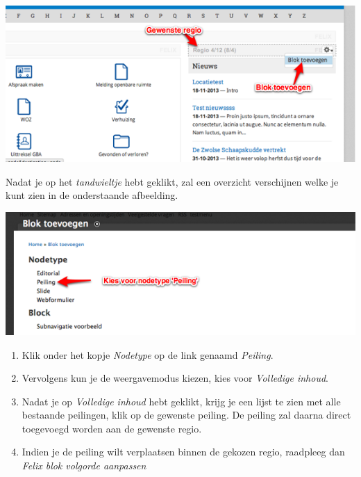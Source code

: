 \begin{center}
	\includegraphics[width=\textwidth]{img/peiling_2.png}
\end{center}

Nadat je op het \emph{tandwieltje} hebt geklikt, zal een overzicht verschijnen welke je kunt zien in de onderstaande afbeelding.

\begin{center}
	\includegraphics[width=\textwidth]{img/peiling_3.png}
\end{center}

\begin{enumerate}
\item Klik onder het kopje \emph{Nodetype} op de link genaamd \emph{Peiling}.
\item Vervolgens kun je de weergavemodus kiezen, kies voor \emph{Volledige inhoud}.
\item Nadat je op \emph{Volledige inhoud} hebt geklikt, krijg je een lijst te zien met alle bestaande peilingen, klik op de gewenste peiling. De peiling zal daarna direct toegevoegd worden aan de gewenste regio.
\item Indien je de peiling wilt verplaatsen binnen de gekozen regio, raadpleeg dan \emph{Felix blok volgorde aanpassen} 
\end{enumerate}

